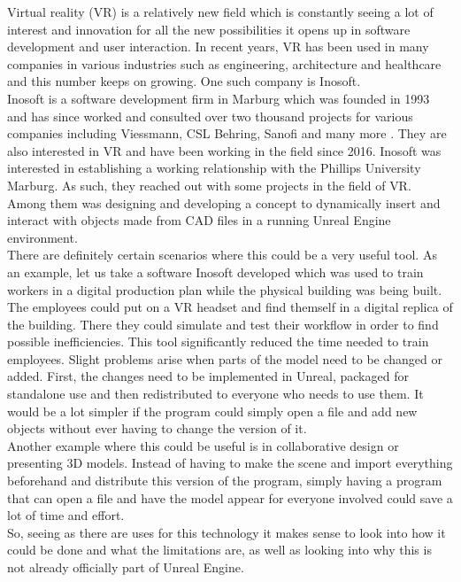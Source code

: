 Virtual reality (\acs{VR}) is a relatively new field which is constantly seeing a lot of interest and innovation for all the new possibilities it opens up in software development and user interaction. In recent years, \acs{VR} has been used in many companies in various industries such as engineering, architecture and healthcare and this number keeps on growing\cite{bib:VRFields}. One such company is Inosoft.\\
Inosoft is a software development firm in Marburg which was founded in 1993 and has since worked and consulted over two thousand projects for various companies including Viessmann, CSL Behring, Sanofi and many more \cite{bib:InosoftAbout}. They are also interested in \acs{VR} and have been working in the field since 2016. Inosoft was interested in establishing a working relationship with the Phillips University Marburg. As such, they reached out with some projects in the field of \acs{VR}. Among them was designing and developing a concept to dynamically insert and interact with objects made from \acs{CAD} files in a running Unreal Engine environment.\\
There are definitely certain scenarios where this could be a very useful tool. As an example, let us take a software Inosoft developed which was used to train workers in a digital production plan while the physical building was being built\cite{bib:InosoftProject}. The employees could put on a VR headset and find themself in a digital replica of the building. There they could simulate and test their workflow in order to find possible inefficiencies. This tool significantly reduced the time needed to train employees. Slight problems arise when parts of the model need to be changed or added. First, the changes need to be implemented in Unreal, packaged for standalone use and then redistributed to everyone who needs to use them. It would be a lot simpler if the program could simply open a file and add new objects without ever having to change the version of it.\\
Another example where this could be useful is in collaborative design or presenting 3D models. Instead of having to make the scene and import everything beforehand and distribute this version of the program, simply having a program that can open a file and have the model appear for everyone involved could save a lot of time and effort.\\
So, seeing as there are uses for this technology it makes sense to look into how it could be done and what the limitations are, as well as looking into why this is not already officially part of Unreal Engine.


